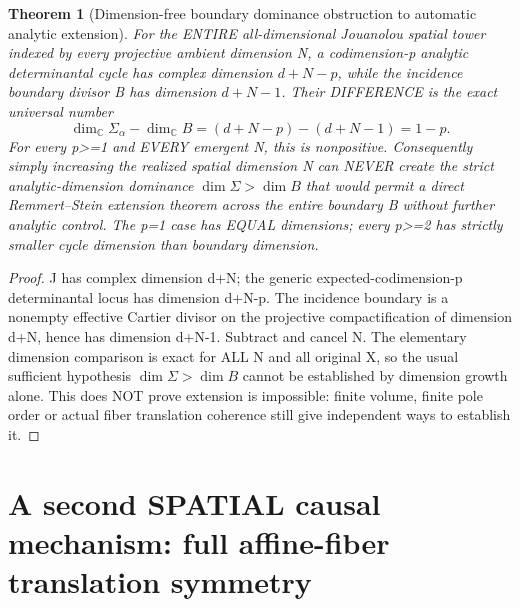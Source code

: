 \documentclass[11pt]{article}
\newtheorem{theorem}{Theorem}[section]
\begin{document}
\begin{theorem}[Dimension-free boundary dominance obstruction to automatic analytic extension]
For the ENTIRE all-dimensional
Jouanolou spatial tower indexed by
every projective ambient dimension
N, a codimension-p analytic
determinantal cycle has complex
dimension $d+N-p$, while the
incidence boundary divisor B has
dimension $d+N-1$. Their
DIFFERENCE is the exact
universal number
\[
 \boxed{
 \dim_\mathbb C \Sigma_\alpha-
 \dim_\mathbb C B
 =(d+N-p)-(d+N-1)=1-p.
 }                                                        \tag{11.3}
\]
For every p>=1 and EVERY
emergent N, this is nonpositive.
Consequently simply increasing
the realized spatial dimension
N can NEVER create the strict
analytic-dimension dominance
$\dim\Sigma>\dim B$ that
would permit a direct
Remmert--Stein extension theorem
across the entire boundary
B without further analytic
control. The p=1 case has
EQUAL dimensions; every p>=2
has strictly smaller cycle
dimension than boundary
dimension.
\end{theorem}
\begin{proof}
J has complex dimension d+N;
the generic expected-codimension-p
determinantal locus has dimension
d+N-p. The incidence boundary
is a nonempty effective Cartier
divisor on the projective
compactification of dimension
d+N, hence has dimension
d+N-1. Subtract and cancel N.
The elementary dimension
comparison is exact for ALL N
and all original X, so the
usual sufficient hypothesis
$\dim\Sigma>\dim B$ cannot
be established by dimension
growth alone.
This does NOT prove extension
is impossible: finite volume,
finite pole order or actual
fiber translation coherence
still give independent ways
to establish it.
\end{proof}

\section{A second SPATIAL causal mechanism: full affine-fiber translation symmetry}
\end{document}
